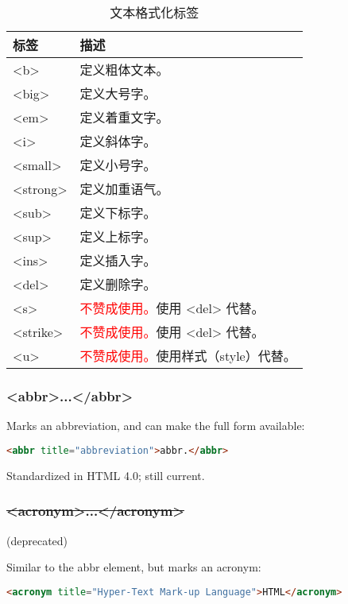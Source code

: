 \begin{table}[!h]
\centering
\caption{文本格式化标签}
\begin{tabular}{|l|l|}
\hline
标签		&描述							\\
\hline
<b>		&定义粗体文本。					\\
\hline
<big>	&定义大号字。					\\
\hline
<em>	&定义着重文字。					\\
\hline
<i>		&定义斜体字。					\\
\hline
<small>	&定义小号字。					\\
\hline
<strong>	&定义加重语气。					\\
\hline
<sub>	&定义下标字。					\\
\hline
<sup>	&定义上标字。					\\
\hline
<ins>	&定义插入字。					\\
\hline
<del>	&定义删除字。					\\
\hline
<s>		&\textcolor{Red}{不赞成使用。}使用 <del> 代替。\\
\hline
<strike>	&\textcolor{Red}{不赞成使用。}使用 <del> 代替。\\
\hline
<u>		&\textcolor{Red}{不赞成使用。}使用样式（style）代替。\\
\hline
\end{tabular}
\end{table}



\subsubsection{<abbr>...</abbr>}

Marks an abbreviation, and can make the full form available:

\begin{lstlisting}[language=HTML]
<abbr title="abbreviation">abbr.</abbr>
\end{lstlisting}

Standardized in HTML 4.0; still current.


\subsubsection{\sout{<acronym>...</acronym>}}

(deprecated)

Similar to the abbr element, but marks an acronym:

\begin{lstlisting}[language=HTML]
<acronym title="Hyper-Text Mark-up Language">HTML</acronym>
\end{lstlisting}


